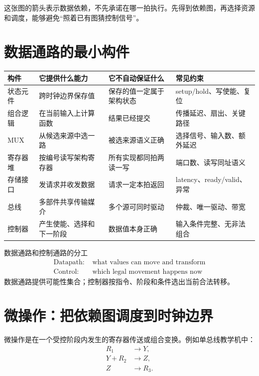 \documentclass[UTF8,fontset=fandol,11pt,a4paper]{ctexart}
\begin{document}
这张图的箭头表示数据依赖，不先承诺在哪一拍执行。先得到依赖图，再选择资源和调度，能够避免“照着已有图猜控制信号”。

\section{数据通路的最小构件}

\begin{center}
\small
\begin{tabularx}{\linewidth}{L{2.4cm}YYL{3.4cm}}
\toprule
构件 & 它提供什么能力 & 它不自动保证什么 & 常见约束 \\
\midrule
状态元件 & 跨时钟边界保存值 & 保存的值一定属于架构状态 & setup/hold、写使能、复位 \\
组合逻辑 & 在当前输入上计算函数 & 结果已经提交 & 传播延迟、扇出、关键路径 \\
MUX & 从候选来源中选一路 & 被选来源语义正确 & 选择信号、输入数、额外延迟 \\
寄存器堆 & 按编号读写架构寄存器 & 所有实现都同拍两读一写 & 端口数、读写同址语义 \\
存储接口 & 发请求并收发数据 & 请求一定本拍返回 & latency、ready/valid、异常 \\
总线 & 多部件共享传输媒介 & 多个源可同时驱动 & 仲裁、唯一驱动、带宽 \\
控制器 & 产生使能、选择和下一阶段 & 数据值本身正确 & 输入条件完整、无非法组合 \\
\bottomrule
\end{tabularx}
\end{center}

\begin{corebox}{数据通路和控制通路的分工}
\[
\boxed{\begin{aligned}
\text{Datapath: }&\text{what values can move and transform}\\
\text{Control: }&\text{which legal movement happens now}
\end{aligned}}
\]
数据通路提供可能性集合；控制器按指令、阶段和条件选出当前合法转移。
\end{corebox}

\section{微操作：把依赖图调度到时钟边界}

微操作是在一个受控阶段内发生的寄存器传送或组合变换。例如单总线教学机中：
\begin{align*}
R_1 &\to Y,\\
Y+R_2 &\to Z,\\
Z &\to R_3.
\end{align*}
\end{document}
